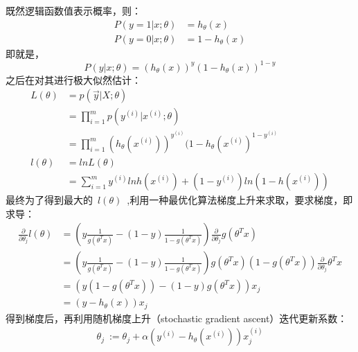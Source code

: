 既然逻辑函数值表示概率，则：
\begin{equation}\nonumber
\begin{split}
  P(y=1|x;\theta) &= h_\theta(x)\\
  P(y=0|x;\theta) &= 1-h_\theta(x)
\end{split}
\end{equation}
即就是，
$$P(y|x;\theta)=(h_\theta(x))^y(1-h_\theta(x))^{1-y}$$
之后在对其进行极大似然估计：
\begin{equation}\nonumber
\begin{split}
  L(\theta) &= p(\overrightarrow{y}|X;\theta)\\
            &= \prod_{i=1}^{m}p(y^{(i)}|x^{(i)};\theta)\\
            &= \prod_{i=1}^{m}(h_\theta(x^{(i)}))^{y^{(i)}}(1-h_\theta(x^{(i)})^{1-y^{(i)}}\\
  l(\theta) &= ln L(\theta)\\
            &= \sum_{i=1}^{m}y^{(i)}lnh(x^{(i)})+(1-y^{(i)})ln(1-h(x^{(i)}))
\end{split}
\end{equation}
最终为了得到最大的~$l(\theta)$~,利用一种最优化算法梯度上升来求取，要求梯度，即求导：
\begin{equation}\nonumber
\begin{split}
  \frac{\partial}{\partial\theta_j}l(\theta) &= ( y\frac{1}{g(\theta^Tx)}-(1-y)\frac{1}{1-g(\theta^Tx)})\frac{\partial}{\partial\theta_j}g(\theta^Tx)\\
            &= ( y\frac{1}{g(\theta^Tx)}-(1-y)\frac{1}{1-g(\theta^Tx)})g(\theta^Tx)(1-g(\theta^Tx))\frac{\partial}{\partial\theta_j}\theta^Tx\\
            &= (y(1-g(\theta^Tx))-(1-y)g(\theta^Tx))x_j\\
            &= (y-h_\theta(x))x_j
\end{split}
\end{equation}
得到梯度后，再利用随机梯度上升（stochastic gradient ascent）迭代更新系数：
\begin{equation}\nonumber
\begin{split}
  \theta_j ~:=\theta_j+\alpha(y^{(i)}-h_\theta(x^{(i)}))x_j^{(i)}
\end{split}
\end{equation}


